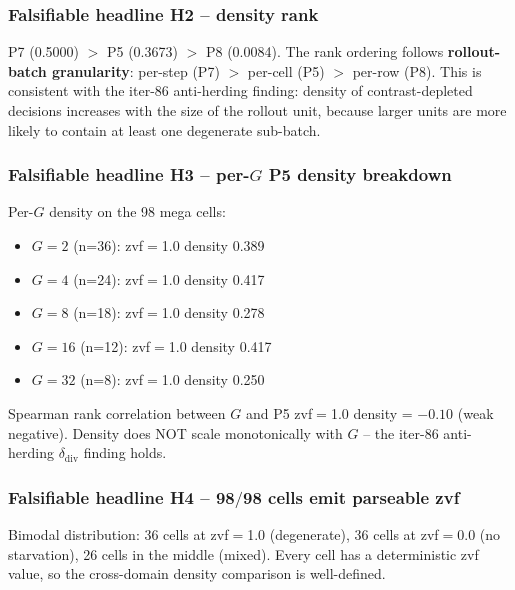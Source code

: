 \subsubsection{Falsifiable headline H2 -- density rank}
P7 (0.5000) $>$ P5 (0.3673) $>$ P8 (0.0084).  The rank ordering follows
\textbf{rollout-batch granularity}: per-step (P7) $>$ per-cell (P5)
$>$ per-row (P8).  This is consistent with the iter-86 anti-herding
finding: density of contrast-depleted decisions increases with the size
of the rollout unit, because larger units are more likely to contain at
least one degenerate sub-batch.

\subsubsection{Falsifiable headline H3 -- per-$G$ P5 density breakdown}
Per-$G$ density on the 98 mega cells:
\begin{itemize}
\item $G{=}2$  (n=36): zvf$=$1.0 density 0.389
\item $G{=}4$  (n=24): zvf$=$1.0 density 0.417
\item $G{=}8$  (n=18): zvf$=$1.0 density 0.278
\item $G{=}16$ (n=12): zvf$=$1.0 density 0.417
\item $G{=}32$ (n=8):  zvf$=$1.0 density 0.250
\end{itemize}
Spearman rank correlation between $G$ and P5 zvf$=$1.0 density = $-0.10$
(weak negative).  Density does NOT scale monotonically with $G$ -- the
iter-86 anti-herding $\delta_{\text{div}}$ finding holds.

\subsubsection{Falsifiable headline H4 -- 98$/$98 cells emit parseable zvf}
Bimodal distribution: 36 cells at zvf$=$1.0 (degenerate),
36 cells at zvf$=$0.0 (no starvation), 26 cells in the middle
(mixed).  Every cell has a deterministic zvf value, so the cross-domain
density comparison is well-defined.

